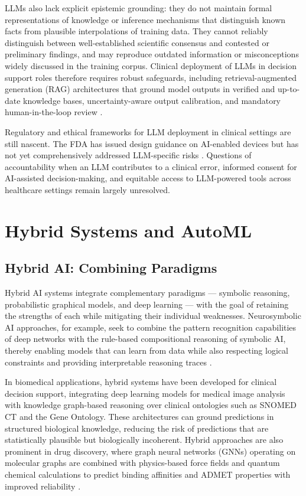 LLMs also lack explicit epistemic grounding: they do not maintain formal representations of knowledge or inference mechanisms that distinguish known facts from plausible interpolations of training data. They cannot reliably distinguish between well-established scientific consensus and contested or preliminary findings, and may reproduce outdated information or misconceptions widely discussed in the training corpus. Clinical deployment of LLMs in decision support roles therefore requires robust safeguards, including retrieval-augmented generation (RAG) architectures that ground model outputs in verified and up-to-date knowledge bases, uncertainty-aware output calibration, and mandatory human-in-the-loop review \parencite{lewis2020}.

Regulatory and ethical frameworks for LLM deployment in clinical settings are still nascent. The FDA has issued design guidance on AI-enabled devices but has not yet comprehensively addressed LLM-specific risks \parencite{fda2023}. Questions of accountability when an LLM contributes to a clinical error, informed consent for AI-assisted decision-making, and equitable access to LLM-powered tools across healthcare settings remain largely unresolved.

\section{Hybrid Systems and AutoML}

\subsection{Hybrid AI: Combining Paradigms}

Hybrid AI systems integrate complementary paradigms --- symbolic reasoning, probabilistic graphical models, and deep learning --- with the goal of retaining the strengths of each while mitigating their individual weaknesses. Neurosymbolic AI approaches, for example, seek to combine the pattern recognition capabilities of deep networks with the rule-based compositional reasoning of symbolic AI, thereby enabling models that can learn from data while also respecting logical constraints and providing interpretable reasoning traces \parencite{marcus2019, garcez2023}.

In biomedical applications, hybrid systems have been developed for clinical decision support, integrating deep learning models for medical image analysis with knowledge graph-based reasoning over clinical ontologies such as SNOMED CT and the Gene Ontology. These architectures can ground predictions in structured biological knowledge, reducing the risk of predictions that are statistically plausible but biologically incoherent. Hybrid approaches are also prominent in drug discovery, where graph neural networks (GNNs) operating on molecular graphs are combined with physics-based force fields and quantum chemical calculations to predict binding affinities and ADMET properties with improved reliability \parencite{wieder2020}.

